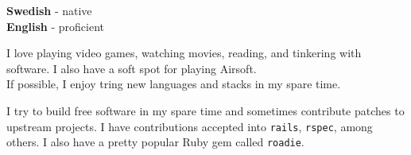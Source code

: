 \documentclass[9pt]{developercv} %
\begin{document}

\begin{minipage}[t]{0.3\textwidth}
	\vspace{-\baselineskip} %


	\textbf{Swedish} - native\\
	\textbf{English} - proficient
\end{minipage}
\hfill
\begin{minipage}[t]{0.3\textwidth}
	\vspace{-\baselineskip} %


  I love playing video games, watching movies, reading, and tinkering with
  software. I also have a soft spot for playing Airsoft.\\ If possible, I enjoy
  tring new languages and stacks in my spare time.
\end{minipage}
\hfill
\begin{minipage}[t]{0.3\textwidth}
	\vspace{-\baselineskip} %


  I try to build free software in my spare time and sometimes contribute
  patches to upstream projects. I have contributions accepted into
  \texttt{rails}, \texttt{rspec}, among others. I also have a pretty popular
  Ruby gem called \texttt{roadie}.
\end{minipage}


\end{document}
